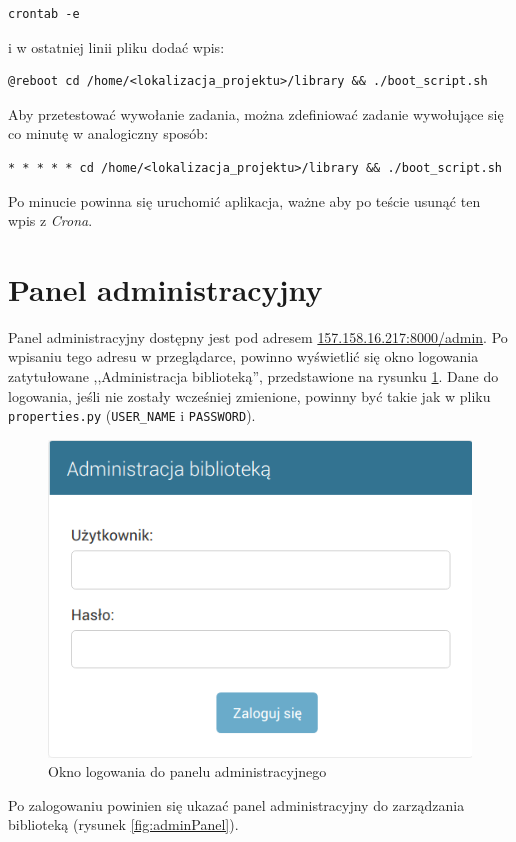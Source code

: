 \documentclass[twoside]{projektInzynierskiMS}
\begin{document}
\begin{verbatim}
crontab -e
\end{verbatim}

i w ostatniej linii pliku dodać wpis:

\begin{verbatim}
@reboot cd /home/<lokalizacja_projektu>/library && ./boot_script.sh
\end{verbatim}

Aby przetestować wywołanie zadania, można zdefiniować zadanie wywołujące się co minutę w analogiczny sposób:

\begin{verbatim}
* * * * * cd /home/<lokalizacja_projektu>/library && ./boot_script.sh
\end{verbatim}

Po minucie powinna się uruchomić aplikacja, ważne aby po teście usunąć ten wpis z \textit{Crona}. 


\section{Panel administracyjny}

Panel administracyjny dostępny jest pod adresem \href{http://157.158.16.217:8000/admin}{157.158.16.217:8000/admin}. Po wpisaniu tego adresu w przeglądarce, powinno wyświetlić się okno logowania zatytułowane ,,Administracja biblioteką'', przedstawione na rysunku \ref{fig:adminLogin}. Dane do logowania, jeśli nie zostały wcześniej zmienione, powinny być takie jak w pliku \verb`properties.py` (\verb`USER_NAME` i \verb`PASSWORD`). 

\begin{figure}[h]
  \centering
  \includegraphics[width=0.6\linewidth]{img/backend/oknLogowania.png}
  \caption{Okno logowania do panelu administracyjnego}
  \label{fig:adminLogin}
\end{figure}

Po zalogowaniu powinien się ukazać panel administracyjny do zarządzania biblioteką (rysunek \ref{fig:adminPanel}). 
\end{document}
